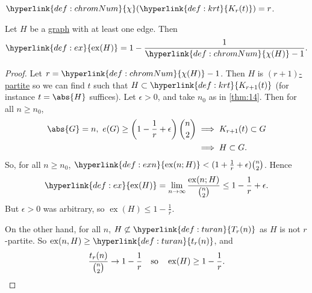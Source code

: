 \documentclass{article}
\DeclareMathOperator{\ext}{ex}
\begin{document}

\begin{eg}
    $\hyperlink{def:chromNum}{\chi}(\hyperlink{def:krt}{K_r(t)}) = r$.
\end{eg}

\begin{ncor}\label{cor:15}
    Let $H$ be a \hyperlink{def:graph}{graph} with at least one edge. Then
    \begin{equation*}
        \hyperlink{def:ex}{\ext(H)} = 1 - \frac{1}{\hyperlink{def:chromNum}{\chi(H)} - 1}.
    \end{equation*}
\end{ncor}

\begin{proof}
    Let $r = \hyperlink{def:chromNum}{\chi(H)} - 1$.
    Then $H$ is \hyperlink{def:rpartite}{$(r+1)$-partite} so we can find $t$ such that $H \subset \hyperlink{def:krt}{K_{r+1}(t)}$ (for instance $t = \abs{H}$ suffices).
    Let $\epsilon > 0$, and take $n_0$ as in \cref{thm:14}.
    Then for all $n \geq n_0$,
    \begin{align*}
        \abs{G} = n, \ e(G) \geq \left(1 - \frac{1}{r} + \epsilon\right) \binom{n}{2} &\implies K_{r+1}(t) \subset G \\
                                                                           &\implies H \subset G.
    \end{align*}
    So, for all $n \geq n_0$, $\hyperlink{def:exn}{\ext(n; H)} < (1 + \frac{1}{r} + \epsilon) \binom{n}{2}$. Hence
    \begin{equation*}
        \hyperlink{def:ex}{\ext(H)} = \lim_{n \to \infty} \frac{\ext(n; H)}{\binom{n}{2}} \leq 1 - \frac{1}{r} + \epsilon.
    \end{equation*}
    But $\epsilon>0$ was arbitrary, so $\ext(H) \leq 1 - \frac{1}{r}$.

    On the other hand, for all $n$, $H \not\subset \hyperlink{def:turan}{T_r(n)}$ as $H$ is not $r$-partite. So $\ext(n, H) \geq \hyperlink{def:turan}{t_r(n)}$, and
    \begin{equation*}
        \frac{t_r(n)}{\binom{n}{2}} \to 1 - \frac{1}{r} \quad \text{so} \quad \ext(H) \geq 1 - \frac{1}{r}. \qedhere
    \end{equation*}
\end{proof}
\end{document}
